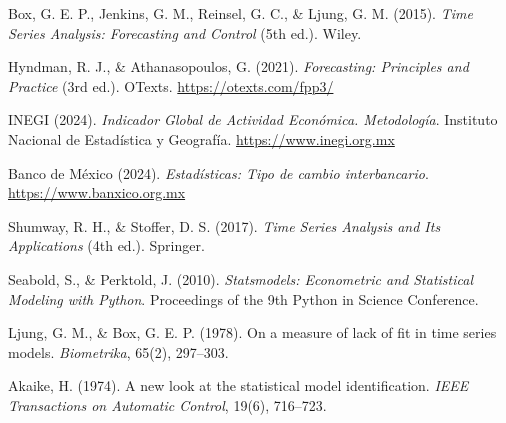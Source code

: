 \documentclass[12pt,a4paper]{article}
\begin{document}
\begin{enumerate}[label={[\arabic*]}]
  \item Box, G. E. P., Jenkins, G. M., Reinsel, G. C., \& Ljung, G. M. (2015). \textit{Time Series Analysis: Forecasting and Control} (5th ed.). Wiley.

  \item Hyndman, R. J., \& Athanasopoulos, G. (2021). \textit{Forecasting: Principles and Practice} (3rd ed.). OTexts. \url{https://otexts.com/fpp3/}

  \item INEGI (2024). \textit{Indicador Global de Actividad Económica. Metodología}. Instituto Nacional de Estadística y Geografía. \url{https://www.inegi.org.mx}

  \item Banco de México (2024). \textit{Estadísticas: Tipo de cambio interbancario}. \url{https://www.banxico.org.mx}

  \item Shumway, R. H., \& Stoffer, D. S. (2017). \textit{Time Series Analysis and Its Applications} (4th ed.). Springer.

  \item Seabold, S., \& Perktold, J. (2010). \textit{Statsmodels: Econometric and Statistical Modeling with Python}. Proceedings of the 9th Python in Science Conference.

  \item Ljung, G. M., \& Box, G. E. P. (1978). On a measure of lack of fit in time series models. \textit{Biometrika}, 65(2), 297--303.

  \item Akaike, H. (1974). A new look at the statistical model identification. \textit{IEEE Transactions on Automatic Control}, 19(6), 716--723.
\end{enumerate}
\end{document}
